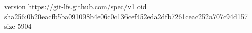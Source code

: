 version https://git-lfs.github.com/spec/v1
oid sha256:0b20eacfb5ba091098b4e06c0c136cef452eda2dfb7261ceac252a707c94d157
size 5904
